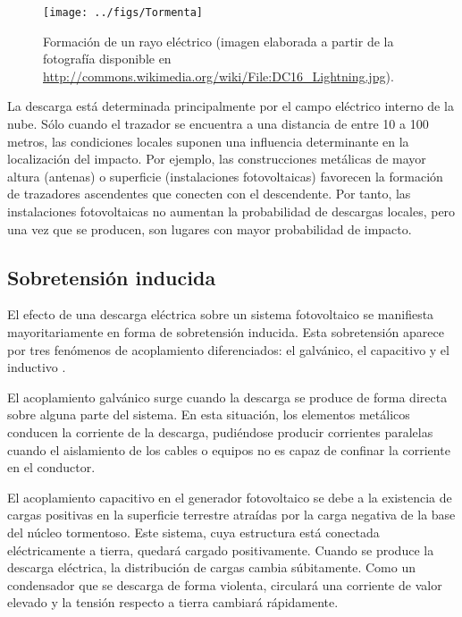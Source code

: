 %
\begin{figure}
\begin{centering}
\texttt{[image: ../figs/Tormenta]}
\end{centering}

\caption[Formación de un rayo eléctrico.]{\label{fig:Formaci=0000F3nRayo}Formación de un rayo eléctrico {\footnotesize (imagen
elaborada a partir de la fotografía disponible en }\protect \\
{\footnotesize \protect\url{http://commons.wikimedia.org/wiki/File:DC16_Lightning.jpg})}. }

\end{figure}


La descarga está determinada principalmente por el campo eléctrico
interno de la nube. Sólo cuando el trazador se encuentra a una distancia
de entre 10 a 100 metros, las condiciones locales suponen una influencia
determinante en la localización del impacto. Por ejemplo, las construcciones
metálicas de mayor altura (antenas) o superficie (instalaciones fotovoltaicas)
favorecen la formación de trazadores ascendentes que conecten con
el descendente. Por tanto, las instalaciones fotovoltaicas no aumentan
la probabilidad de descargas locales, pero una vez que se producen,
son lugares con mayor probabilidad de impacto.


\subsection{Sobretensión inducida}

El efecto de una descarga eléctrica sobre un sistema fotovoltaico
se manifiesta mayoritariamente en forma de sobretensión inducida.
Esta sobretensión aparece por tres fenómenos de acoplamiento diferenciados:
el galvánico, el capacitivo y el inductivo \cite{Becker.Vaaben.ea2000}.

El acoplamiento galvánico surge cuando la descarga se produce de forma
directa sobre alguna parte del sistema. En esta situación, los elementos
metálicos conducen la corriente de la descarga, pudiéndose producir
corrientes paralelas cuando el aislamiento de los cables o equipos
no es capaz de confinar la corriente en el conductor.

El acoplamiento capacitivo en el generador fotovoltaico se debe a
la existencia de cargas positivas en la superficie terrestre atraídas
por la carga negativa de la base del núcleo tormentoso. Este sistema,
cuya estructura está conectada eléctricamente a tierra, quedará cargado
positivamente. Cuando se produce la descarga eléctrica, la distribución
de cargas cambia súbitamente. Como un condensador que se descarga
de forma violenta, circulará una corriente de valor elevado y la tensión
respecto a tierra cambiará rápidamente. 


